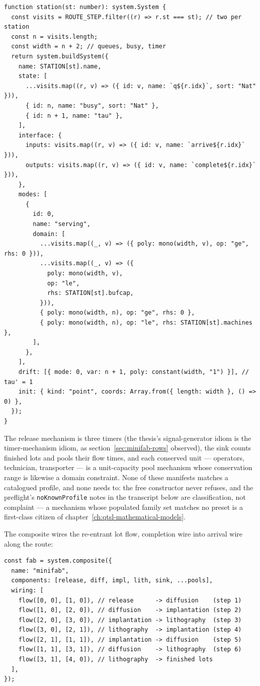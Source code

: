 \begin{Verbatim}[fontsize=\small,frame=leftline,rulecolor=\color{accentmid},framesep=3mm,xleftmargin=3mm]
function station(st: number): system.System {
  const visits = ROUTE_STEP.filter((r) => r.st === st); // two per station
  const n = visits.length;
  const width = n + 2; // queues, busy, timer
  return system.buildSystem({
    name: STATION[st].name,
    state: [
      ...visits.map((r, v) => ({ id: v, name: `q${r.idx}`, sort: "Nat" })),
      { id: n, name: "busy", sort: "Nat" },
      { id: n + 1, name: "tau" },
    ],
    interface: {
      inputs: visits.map((r, v) => ({ id: v, name: `arrive${r.idx}` })),
      outputs: visits.map((r, v) => ({ id: v, name: `complete${r.idx}` })),
    },
    modes: [
      {
        id: 0,
        name: "serving",
        domain: [
          ...visits.map((_, v) => ({ poly: mono(width, v), op: "ge", rhs: 0 })),
          ...visits.map((_, v) => ({
            poly: mono(width, v),
            op: "le",
            rhs: STATION[st].bufcap,
          })),
          { poly: mono(width, n), op: "ge", rhs: 0 },
          { poly: mono(width, n), op: "le", rhs: STATION[st].machines },
        ],
      },
    ],
    drift: [{ mode: 0, var: n + 1, poly: constant(width, "1") }], // tau' = 1
    init: { kind: "point", coords: Array.from({ length: width }, () => 0) },
  });
}
\end{Verbatim}

\noindent The release mechanism is three timers (the thesis's
signal-generator idiom is the timer-mechanism idiom, as
section~\ref{sec:minifab-rows} observed), the sink counts finished
lots and pools their flow times, and each conserved unit ---
operators, technician, transporter --- is a unit-capacity pool
mechanism whose conservation range is likewise a domain constraint.
None of these manifests matches a catalogued profile, and none needs
to: the free constructor never refuses, and the preflight's
\texttt{noKnownProfile} notes in the transcript below are
classification, not complaint --- a mechanism whose populated family
set matches no preset is a first-class citizen of
chapter~\ref{ch:qtsl-mathematical-models}.

The composite wires the re-entrant lot flow, completion wire into
arrival wire along the route:

\begin{Verbatim}[fontsize=\small,frame=leftline,rulecolor=\color{accentmid},framesep=3mm,xleftmargin=3mm]
const fab = system.composite({
  name: "minifab",
  components: [release, diff, impl, lith, sink, ...pools],
  wiring: [
    flow([0, 0], [1, 0]), // release      -> diffusion    (step 1)
    flow([1, 0], [2, 0]), // diffusion    -> implantation (step 2)
    flow([2, 0], [3, 0]), // implantation -> lithography  (step 3)
    flow([3, 0], [2, 1]), // lithography  -> implantation (step 4)
    flow([2, 1], [1, 1]), // implantation -> diffusion    (step 5)
    flow([1, 1], [3, 1]), // diffusion    -> lithography  (step 6)
    flow([3, 1], [4, 0]), // lithography  -> finished lots
  ],
});
\end{Verbatim}

